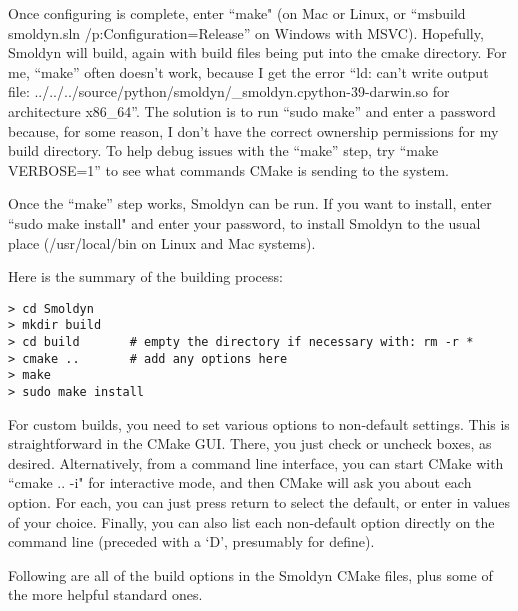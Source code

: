 \documentclass {scrbook}
\begin{document}
Once configuring is complete, enter ``make" (on Mac or Linux, or ``msbuild smoldyn.sln /p:Configuration=Release'' on Windows with MSVC). Hopefully, Smoldyn will build, again with build files being put into the cmake directory. For me, ``make'' often doesn't work, because I get the error ``ld: can't write output file: ../../../source/python/smoldyn/\_smoldyn.cpython-39-darwin.so for architecture x86\_64''. The solution is to run ``sudo make'' and enter a password because, for some reason, I don't have the correct ownership permissions for my build directory. To help debug issues with the ``make'' step, try ``make VERBOSE=1'' to see what commands CMake is sending to the system.

Once the ``make'' step works, Smoldyn can be run. If you want to install, enter ``sudo make install" and enter your password, to install Smoldyn to the usual place (/usr/local/bin on Linux and Mac systems).

Here is the summary of the building process:

\begin{lstlisting}
> cd Smoldyn
> mkdir build
> cd build       # empty the directory if necessary with: rm -r *
> cmake ..	     # add any options here
> make
> sudo make install
\end{lstlisting}

For custom builds, you need to set various options to non-default settings. This is straightforward in the CMake GUI. There, you just check or uncheck boxes, as desired. Alternatively, from a command line interface, you can start CMake with ``cmake .. -i" for interactive mode, and then CMake will ask you about each option. For each, you can just press return to select the default, or enter in values of your choice. Finally, you can also list each non-default option directly on the command line (preceded with a `D', presumably for define).

Following are all of the build options in the Smoldyn CMake files, plus some of the more helpful standard ones.
\end{document}
